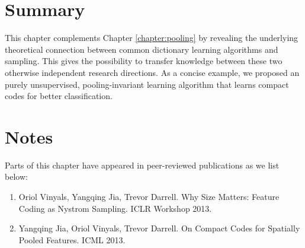 \section{Summary}
This chapter complements Chapter \ref{chapter:pooling} by revealing the underlying theoretical connection between common dictionary learning algorithms and \nystrom sampling. This gives the possibility to transfer knowledge between these two otherwise independent research directions. As a concise example, we proposed an purely unsupervised, pooling-invariant learning algorithm that learns compact codes for better classification.

\section*{Notes}
Parts of this chapter have appeared in peer-reviewed publications as we list below:
\begin{enumerate}
\item Oriol Vinyals, Yangqing Jia, Trevor Darrell. Why Size Matters: Feature Coding as Nystrom Sampling. ICLR Workshop 2013.
\item Yangqing Jia, Oriol Vinyals, Trevor Darrell. On Compact Codes for Spatially Pooled Features. ICML 2013.
\end{enumerate}
